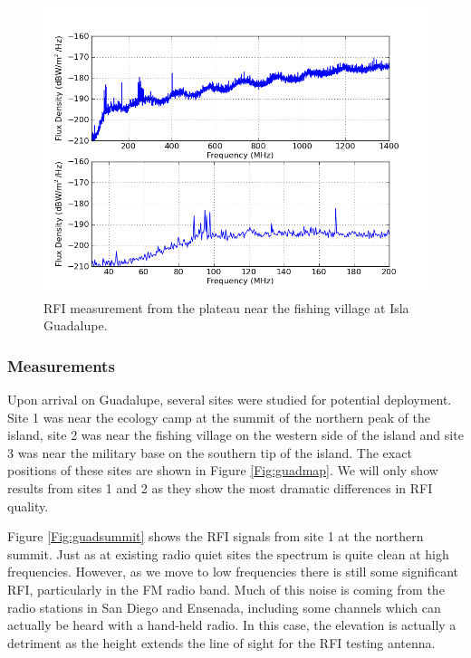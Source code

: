 \begin{figure}[htb]
\begin{center}
\includegraphics[width=0.9\linewidth]{RFI_testing/figures/GI_2__cal.png}
\caption{RFI measurement from the plateau near the fishing village at Isla Guadalupe.}
\label{Fig:guadlow}
\end{center}
\end{figure}

\subsubsection{Measurements}

Upon arrival on Guadalupe, several sites were studied for potential deployment. Site 1 was near the ecology camp at the summit of the northern peak of the island, site 2 was near the fishing village on the western side of the island and site 3 was near the military base on the southern tip of the island. The exact positions of these sites are shown in Figure \ref{Fig:guadmap}. We will only show results from sites 1 and 2 as they show the most dramatic differences in RFI quality. 

Figure \ref{Fig:guadsummit} shows the RFI signals from site 1 at the northern summit. Just as at existing radio quiet sites the spectrum is quite clean at high frequencies. However, as we move to low frequencies there is still some significant RFI, particularly in the FM radio band. Much of this noise is coming from the radio stations in San Diego and Ensenada, including some channels which can actually be heard with a hand-held radio. In this case, the elevation is actually a detriment as the height extends the line of sight for the RFI testing antenna. 

